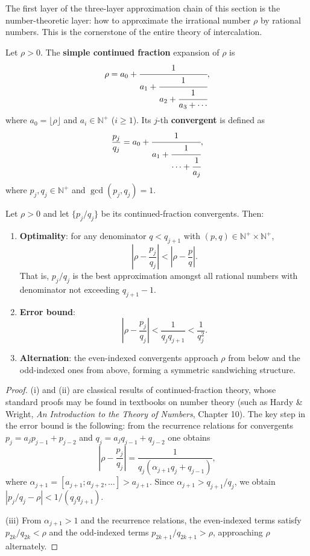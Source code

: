 The first layer of the three-layer approximation chain of this section is the number-theoretic layer: how to approximate the irrational number $\rho$ by rational numbers. This is the cornerstone of the entire theory of intercalation.

\begin{definition}\label{def:continued_fraction_harmonic}
Let $\rho>0$. The \textbf{simple continued fraction} expansion of $\rho$ is
\[
\rho=a_0+\cfrac{1}{a_1+\cfrac{1}{a_2+\cfrac{1}{a_3+\cdots}}},
\]
where $a_0=\lfloor\rho\rfloor$ and $a_i\in\mathbb{N}^+$ ($i\ge 1$). Its $j$-th \textbf{convergent} is defined as
\[
\frac{p_j}{q_j}=a_0+\cfrac{1}{a_1+\cfrac{1}{\cdots+\cfrac{1}{a_j}}},
\]
where $p_j,q_j\in\mathbb{N}^+$ and $\gcd(p_j,q_j)=1$.
\end{definition}

\begin{theorem}\label{thm:continued_fraction_best_approx_harmonic}
Let $\rho>0$ and let $\{p_j/q_j\}$ be its continued-fraction convergents. Then:
\begin{enumerate}[label=(\roman*)]
    \item \textbf{Optimality}: for any denominator $q<q_{j+1}$ with $(p,q)\in\mathbb{N}^+\times\mathbb{N}^+$,
    \[
    \left|\rho-\frac{p_j}{q_j}\right|<\left|\rho-\frac{p}{q}\right|.
    \]
    That is, $p_j/q_j$ is the best approximation amongst all rational numbers with denominator not exceeding $q_{j+1}-1$.
    \item \textbf{Error bound}:
    \[
    \left|\rho-\frac{p_j}{q_j}\right|<\frac{1}{q_jq_{j+1}}<\frac{1}{q_j^2}.
    \]
    \item \textbf{Alternation}: the even-indexed convergents approach $\rho$ from below and the odd-indexed ones from above, forming a symmetric sandwiching structure.
\end{enumerate}
\end{theorem}

\begin{proof}
(i) and (ii) are classical results of continued-fraction theory, whose standard proofs may be found in textbooks on number theory (such as Hardy \& Wright, \textit{An Introduction to the Theory of Numbers}, Chapter 10). The key step in the error bound is the following: from the recurrence relations for convergents $p_j=a_jp_{j-1}+p_{j-2}$ and $q_j=a_jq_{j-1}+q_{j-2}$ one obtains
\[
\left|\rho-\frac{p_j}{q_j}\right|=\frac{1}{q_j(\alpha_{j+1}q_j+q_{j-1})},
\]
where $\alpha_{j+1}=[a_{j+1};a_{j+2},\dots]>a_{j+1}$. Since $\alpha_{j+1}>q_{j+1}/q_j$, we obtain $|p_j/q_j-\rho|<1/(q_jq_{j+1})$.

(iii) From $\alpha_{j+1}>1$ and the recurrence relations, the even-indexed terms satisfy $p_{2k}/q_{2k}<\rho$ and the odd-indexed terms $p_{2k+1}/q_{2k+1}>\rho$, approaching $\rho$ alternately.
\end{proof}

